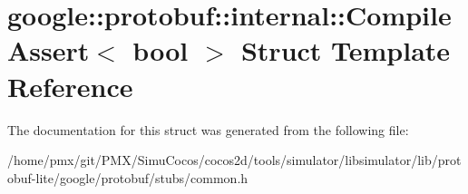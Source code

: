 \hypertarget{structgoogle_1_1protobuf_1_1internal_1_1CompileAssert}{}\section{google\+:\+:protobuf\+:\+:internal\+:\+:Compile\+Assert$<$ bool $>$ Struct Template Reference}
\label{structgoogle_1_1protobuf_1_1internal_1_1CompileAssert}


The documentation for this struct was generated from the following file\+:\begin{DoxyCompactItemize}
\item 
/home/pmx/git/\+P\+M\+X/\+Simu\+Cocos/cocos2d/tools/simulator/libsimulator/lib/protobuf-\/lite/google/protobuf/stubs/common.\+h\end{DoxyCompactItemize}
